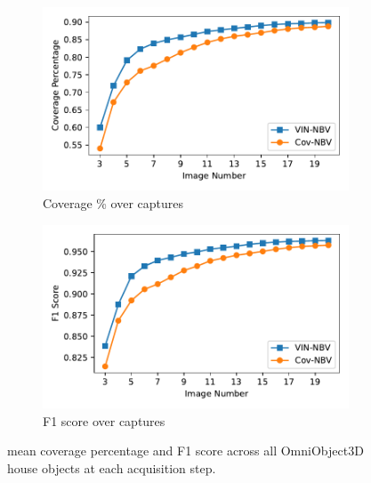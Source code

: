 \begin{figure}
  \centering
  \begin{subfigure}[b]{0.49\columnwidth}
    \centering
    \includegraphics[width=\linewidth]{Figures/house_mean_coverage_graph.pdf}
    \caption{Coverage \% over captures}
    \label{fig:house_coverage_curve}
  \end{subfigure}\hfill
  \begin{subfigure}[b]{0.49\columnwidth}
    \centering
    \includegraphics[width=\linewidth]{Figures/houses_f1.pdf}
    \caption{F1 score over captures}
    \label{fig:house_fcr_bar}
  \end{subfigure}
  \vspace{-0.5em}
  \caption{%
     mean coverage percentage and  F1 score across all OmniObject3D house objects at each acquisition step.
  }
  \label{fig:coverage_metrics_two_panel}
  \vspace{0.5em}
\end{figure}


